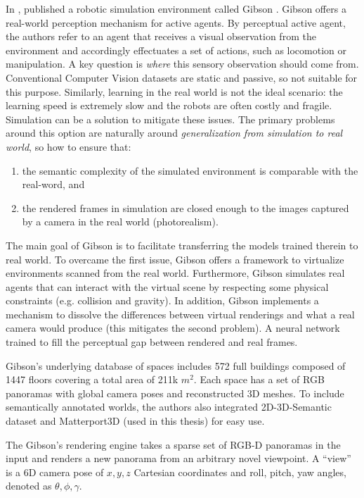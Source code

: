 In \citeyear{gibson}, \citeauthor{gibson} published a robotic simulation environment called Gibson \cite{gibson}. Gibson offers a real-world perception mechanism for active agents. By perceptual active agent, the authors refer to
an agent that receives a visual observation from the environment and accordingly effectuates a set of actions, such as locomotion or manipulation. A key question is \textit{where} this sensory observation should come from. Conventional Computer Vision datasets \cite{coco, imagenet} are static and passive, so not suitable for this purpose.  Similarly, learning in the real world is not the ideal scenario: the learning speed is extremely slow and the robots are often costly and fragile. Simulation can be a solution to mitigate these issues. 
The primary problems around this option are naturally around \textit{generalization
from simulation to real world}, so how to ensure that:
\begin{enumerate}
	\item \label{enum:generalizationtorealworld1} the semantic
	complexity of the simulated environment is comparable with the real-word, and
	\item \label{enum:generalizationtorealworld2} the rendered frames in simulation are closed enough to the images captured by a camera in the real world (photorealism).
\end{enumerate} 
The main goal of Gibson is to facilitate transferring the
models trained therein to real world. To overcame the first issue, Gibson offers a framework to virtualize environments scanned from the real world. Furthermore, Gibson simulates real agents that can interact with the virtual scene by respecting some physical constraints (e.g. collision and gravity). In addition, Gibson implements a mechanism to dissolve the differences between virtual renderings and what a real camera would produce (this mitigates the second problem). A neural network trained to fill the perceptual gap between rendered and real frames.

Gibson’s underlying database of spaces includes 572 full buildings composed of 1447 floors covering a total area of 211k $m^{2}$. Each space has a set of RGB panoramas with global camera poses and reconstructed 3D meshes. To include semantically annotated worlds, the authors also integrated 2D-3D-Semantic dataset \cite{stanford2d3d} and Matterport3D \cite{matterport} (used in this thesis) for easy use.

The Gibson's rendering engine takes a sparse set of RGB-D panoramas in the input and renders a new panorama from an arbitrary novel viewpoint. A ``view'' is a 6D camera pose of $x, y, z$ Cartesian coordinates and roll, pitch, yaw angles, denoted as $\theta, \phi, \gamma$. 


